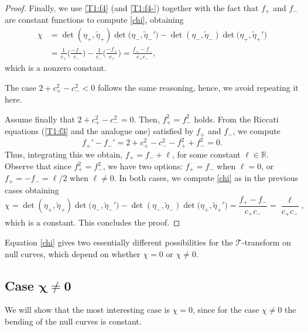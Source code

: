 \documentclass[pdftex]{sigma}
\numberwithin{equation}{section}
\def\R{\mathbb{R}}
\begin{document}
\begin{proof}
	Finally, we use \eqref{T1:f4} (and \eqref{T1:f4-}) together with the fact that $f_+$ and $f_-$ are constant functions to compute \eqref{chi}, obtaining
	\begin{align*}
		\chi&{}=\det (\eta_+,\widetilde{\eta}_+)\det \bigl(\eta_-,\widetilde{\eta}_-'\bigr)-\det (\eta_-,\widetilde{\eta}_-)\det \bigl(\eta_+,\widetilde{\eta}_+'\bigr)\\
		&{}=\frac{1}{c_+}\biggl(\frac{-f_-}{c_-}\biggr)-\frac{1}{c_-}\biggl(\frac{-f_+}{c_+}\biggr)=\frac{f_+-f_-}{c_+c_-},
	\end{align*}
	which is a nonzero constant.
	
	The case $2+c_+^2-c_-^2<0$ follows the same reasoning, hence, we avoid repeating it here.
	
	Assume finally that $2+c_+^2-c_-^2=0$. Then, $f_+^2=f_-^2$ holds. From the Riccati equations (\eqref{T1:f3} and the analogue one) satisfied by $f_+$ and $f_-$, we compute
	\begin{equation*}f_+'-f_-'=2+c_+^2-c_-^2-f_+^2+f_-^2=0.\end{equation*}
	Thus, integrating this we obtain, $f_+=f_-+\ell$, for some constant $\ell\in\R$. Observe that since $f_+^2=f_-^2$, we have two options: $f_+=f_-$ when $\ell=0$, or $f_+=-f_-=\ell/2$ when $\ell\neq 0$. In both cases, we compute \eqref{chi} as in the previous cases obtaining
	\begin{equation*}\chi=\det (\eta_+,\widetilde{\eta}_+)\det \bigl(\eta_-,\widetilde{\eta}_-'\bigr)-\det (\eta_-,\widetilde{\eta}_-)\det \bigl(\eta_+,\widetilde{\eta}_+'\bigr)=\frac{f_+-f_-}{c_+c_-}=\frac{\ell}{c_+c_-},\end{equation*}
	which is a constant. This concludes the proof.
\end{proof}

Equation \eqref{chi} gives two essentially different possibilities for the $\mathcal{T}$-transform on null curves, which depend on whether $\chi=0$ or $\chi\neq 0$.

\subsection[Case chi neq 0]{Case $\boldsymbol{\chi\neq 0}$}

We will show that the most interesting case is $\chi=0$, since for the case $\chi\neq 0$ the bending of the null curves is constant.
\end{document}
